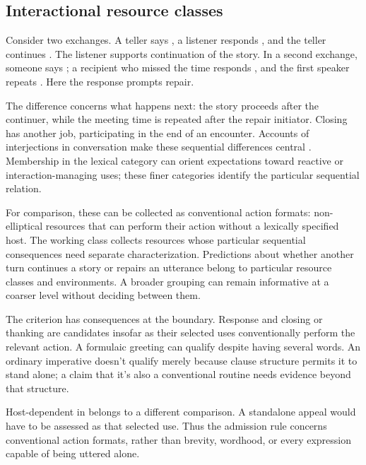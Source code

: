 \documentclass[12pt]{article}
\begin{document}
\subsection{Interactional resource classes}

Consider two exchanges. A teller says , a listener responds , and the teller continues
. The listener supports continuation of the
story. In a second exchange, someone says ;
a recipient who missed the time responds , and the first
speaker repeats . Here the response prompts repair.

The difference concerns what happens next: the story proceeds after
the continuer, while the meeting time is repeated after the repair
initiator. Closing  has another job, participating in the
end of an encounter. Accounts of interjections in conversation make
these sequential differences central \citep[257--259, 263--265]{dingemanse2024}.
Membership in the lexical category can orient expectations toward reactive
or interaction-managing uses; these finer categories identify the particular
sequential relation.

For comparison, these can be collected as conventional action formats:
non-elliptical resources that can perform their action without a lexically
specified host. The working class collects resources whose particular sequential
consequences need separate characterization. Predictions about whether
another turn continues a story or repairs an utterance belong to
particular resource classes and environments. A broader grouping can
remain informative at a coarser level without deciding between them.

The criterion has consequences at the boundary. Response 
and closing or thanking  are candidates insofar as their
selected uses conventionally perform the relevant action. A formulaic
greeting  can qualify despite having several words.
An ordinary imperative  doesn't qualify merely because
clause structure permits it to stand alone; a claim that it's also a
conventional routine needs evidence beyond that structure.

Host-dependent  in  belongs to
a different comparison. A standalone appeal  would have
to be assessed as that selected use. Thus the admission rule concerns
conventional action formats, rather than brevity, wordhood, or every
expression capable of being uttered alone.
\end{document}
